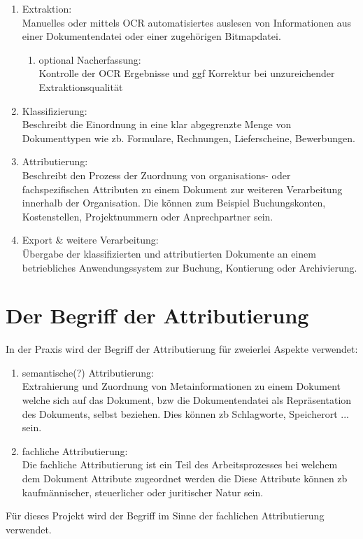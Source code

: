 \begin{enumerate}
\item Extraktion:\\
Manuelles oder mittels OCR automatisiertes auslesen von Informationen aus einer Dokumentendatei oder einer zugehörigen Bitmapdatei.
\begin{enumerate}
\item optional Nacherfassung:\\
Kontrolle der OCR Ergebnisse und ggf Korrektur bei unzureichender Extraktionsqualität
\end{enumerate}
\item Klassifizierung:\\
Beschreibt die Einordnung in eine klar abgegrenzte Menge von Dokumenttypen wie zb. Formulare, Rechnungen, Lieferscheine, 
Bewerbungen.
\item Attributierung:\\
Beschreibt den Prozess der Zuordnung von organisations- oder fachspezifischen Attributen zu einem Dokument zur weiteren
Verarbeitung innerhalb der Organisation. Die können zum Beispiel Buchungskonten, Kostenstellen, Projektnummern oder Anprechpartner   sein.
\item Export \& weitere Verarbeitung:\\
Übergabe der klassifizierten und attributierten Dokumente an einem betriebliches Anwendungssystem zur Buchung, Kontierung oder Archivierung.
\end{enumerate}
\noindent

%
\section{Der Begriff der Attributierung}
In der Praxis wird der Begriff der Attributierung für zweierlei Aspekte verwendet:\\
\begin{enumerate}
\item semantische(?) Attributierung:\\
Extrahierung und Zuordnung von Metainformationen zu einem Dokument welche sich auf das Dokument, bzw die Dokumentendatei als Repräsentation des Dokuments, selbst beziehen. Dies können zb Schlagworte, Speicherort ... sein.
\item fachliche Attributierung:\\
Die fachliche Attributierung ist ein Teil des Arbeitsprozesses bei welchem dem Dokument Attribute zugeordnet werden die 
Diese Attribute können zb kaufmännischer, steuerlicher oder juritischer Natur sein.
\end{enumerate}
\noindent
Für dieses Projekt wird der Begriff im Sinne der fachlichen Attributierung verwendet.

